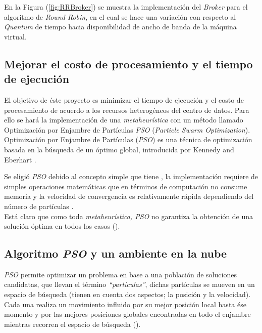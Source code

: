 En la Figura (\ref{fig:RRBroker}) se muestra la implementación del \textit{Broker} para el algoritmo de \textit{Round Robin}, en el cual se hace una variación con respecto al \textit{Quantum} de tiempo hacia disponibilidad de ancho de banda de la máquina virtual.


\subsection{Mejorar el costo de procesamiento y el tiempo de ejecución}

El objetivo de éste proyecto es minimizar el tiempo de ejecución y el costo de procesamiento de acuerdo a los recursos heterogéneos del centro de datos. Para ello se hará la  implementación de una \textit{metaheurística} con un método llamado Optimización por Enjambre de Partículas \textit{PSO} (\textit{Particle Swarm Optimization}).\\

Optimización por Enjambre de Partículas (\textit{PSO}) es una técnica de optimización basada en la búsqueda de un óptimo global, introducida por Kennedy and Eberhart \cite{pandey2010}. 

Se eligió  \textit{PSO} debido al concepto simple que tiene \cite{poli2007},  la implementación requiere de simples operaciones matemáticas que en términos de computación no consume memoria  y la velocidad de convergencia es relativamente rápida dependiendo del número de partículas \cite{eberhart1995}.\\ 
Está claro que como toda \textit{metaheurística, PSO} no garantiza la obtención de una solución óptima en todos los casos (\cite{osman2012}).

\subsection*{Algoritmo \textit{PSO} y un ambiente en la nube}
\textit{PSO} permite optimizar un problema en base a una población de soluciones candidatas, que llevan el término \textit{“partículas”}, dichas partículas se mueven en un espacio de búsqueda (tienen en cuenta dos aspectos; la posición y la velocidad). Cada una realiza un movimiento influido por su mejor posición local hasta ése momento y por las mejores posiciones globales encontradas en todo el enjambre mientras recorren el espacio de búsqueda (\cite{poli2007}).

\newcommand{\itab}[1]{\hspace{0em}\rlap{#1}}
\newcommand{\tab}[1]{\hspace{.2\textwidth}\rlap{#1}}


